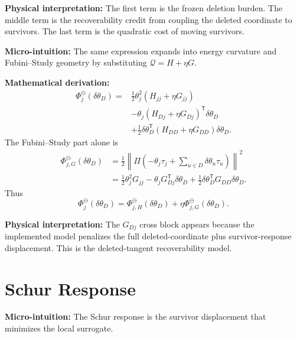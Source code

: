 \documentclass[10pt,twocolumn]{article}
\newcommand{\blocktitle}[1]{\vspace{2pt}\noindent\textbf{#1}\space}
\newcommand{\micro}[1]{\blocktitle{Micro-intuition:} #1}
\newcommand{\deriv}{\blocktitle{Mathematical derivation:}}
\newcommand{\phys}[1]{\blocktitle{Physical interpretation:} #1}
\begin{document}
\phys{The first term is the frozen deletion burden. The middle term is the recoverability credit from coupling the deleted coordinate to survivors. The last term is the quadratic cost of moving survivors.}

\micro{The same expression expands into energy curvature and Fubini--Study geometry by substituting \(\mathcal Q=H+\eta G\).}

\deriv
\[
\begin{aligned}
\Phi_j^\ominus(\delta\theta_D)
={}&
\frac12\theta_j^2(H_{jj}+\eta G_{jj})
\\
&-\theta_j
(H_{Dj}+\eta G_{Dj})^{\mathsf T}\delta\theta_D
\\
&+\frac12
\delta\theta_D^{\mathsf T}
(H_{DD}+\eta G_{DD})
\delta\theta_D .
\end{aligned}
\]
The Fubini--Study part alone is
\[
\begin{aligned}
\Phi_{j,G}^\ominus(\delta\theta_D)
&=
\frac12
\left\|
\Pi\left(
-\theta_j\tau_j+\sum_{u\in D}\delta\theta_u\tau_u
\right)
\right\|^2
\\
&=
\frac12\theta_j^2G_{jj}
-\theta_jG_{Dj}^{\mathsf T}\delta\theta_D
+\frac12\delta\theta_D^{\mathsf T}G_{DD}\delta\theta_D .
\end{aligned}
\]
Thus
\[
\Phi_j^\ominus(\delta\theta_D)
=
\Phi_{j,H}^\ominus(\delta\theta_D)
+\eta\Phi_{j,G}^\ominus(\delta\theta_D).
\]

\phys{The \(G_{Dj}\) cross block appears because the implemented model penalizes the full deleted-coordinate plus survivor-response displacement. This is the deleted-tangent recoverability model.}

\section*{Schur Response}

\micro{The Schur response is the survivor displacement that minimizes the local surrogate.}
\end{document}
